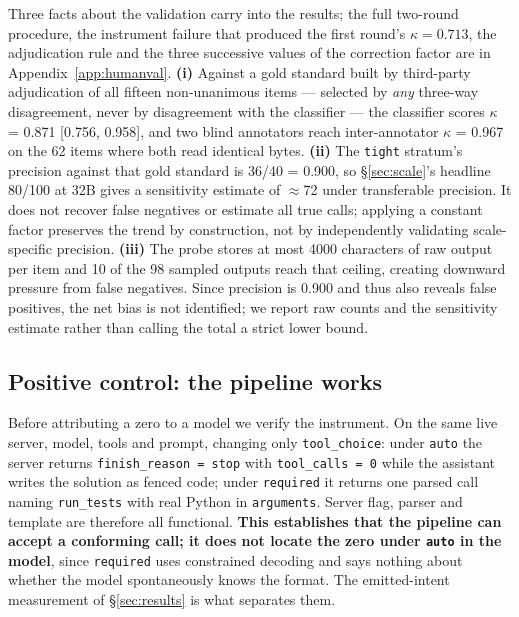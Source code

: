 Three facts about the validation carry into the results; the full two-round procedure, the
instrument failure that produced the first round's $\kappa=0.713$, the adjudication rule and
the three successive values of the correction factor are in Appendix~\ref{app:humanval}.
\textbf{(i)} Against a gold standard built by third-party adjudication of all fifteen
non-unanimous items --- selected by \emph{any} three-way disagreement, never by disagreement
with the classifier --- the classifier scores $\kappa$ = 0.871 [0.756, 0.958], and
two blind annotators reach inter-annotator $\kappa$ = 0.967 on the 62 items where
both read identical bytes. \textbf{(ii)} The \texttt{tight} stratum's precision against that
gold standard is 36/40 = 0.900, so \S\ref{sec:scale}'s headline 80/100 at 32B
gives a sensitivity estimate of $\approx$72 under transferable precision. It does not recover
false negatives or estimate all true calls; applying a constant factor preserves the trend by
construction, not by independently validating scale-specific precision. \textbf{(iii)} The probe
stores at most 4000 characters of raw output per item and 10 of the 98 sampled outputs reach
that ceiling, creating downward pressure from false negatives. Since precision is 0.900 and thus
also reveals false positives, the net bias is not identified; we report raw counts and the sensitivity estimate
rather than calling the total a strict lower bound.

\subsection{Positive control: the pipeline works}
\label{sec:control}

Before attributing a zero to a model we verify the instrument. On the same live server, model,
tools and prompt, changing only \texttt{tool\_choice}: under \texttt{auto} the server returns
\texttt{finish\_reason = stop} with \texttt{tool\_calls = 0} while the assistant writes the solution
as fenced code; under \texttt{required} it returns one parsed call naming \texttt{run\_tests} with
real Python in \texttt{arguments}. Server flag, parser and template are therefore all functional.
\textbf{This establishes that the pipeline can accept a conforming call; it does not locate the
zero under \texttt{auto} in the model}, since \texttt{required} uses constrained decoding and says
nothing about whether the model spontaneously knows the format. The emitted-intent measurement of
\S\ref{sec:results} is what separates them.

